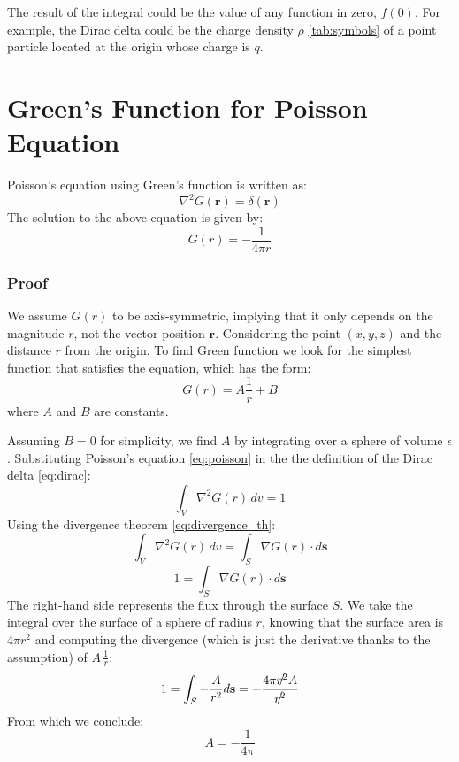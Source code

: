 The result of the integral could be the value of any function in zero, $f(0)$.
For example, the Dirac delta could be the charge density $\rho$ \ref{tab:symbols} 
of a point particle located at the origin whose charge is \(q\).

\section{Green's Function for Poisson Equation}
Poisson's equation using Green's function is written as:
\begin{equation}
\nabla^2 G(\mathbf{r}) = \delta(\mathbf{r})
\label{eq:poisson}
\end{equation}
The solution to the above equation is given by:
\[
G(r) =  - \frac{1}{4 \pi r}
\]
\subsubsection{Proof}
We assume \(G(r)\) to be axis-symmetric, implying that it only depends on the 
magnitude $r$, not the vector position $\mathbf{r}$.
Considering the point \((x,y,z)\) and the distance \(r\) from the origin.
To find Green function we look for the simplest function that satisfies the 
equation, which has the form:
\[
G(r) = A \frac{1}{r} + B
\]
where \(A\) and \(B\) are constants. 

Assuming \(B = 0\) for simplicity, we find \(A\) by integrating over a sphere of 
volume $\epsilon$.
Substituting Poisson's equation \ref{eq:poisson} in the the definition of the 
Dirac delta \ref{eq:dirac}:
\[
\int_V \nabla^2 G(r) \, dv = 1 
\]
Using the divergence theorem \ref{eq:divergence_th}:
\[
\int_V \nabla^2 G(r) \, dv = \int_S \nabla G(r) \cdot d\mathbf{s} 
\]
\[
1 = \int_S \nabla G(r) \cdot d\mathbf{s} 
\]
The right-hand side represents the flux through the surface \(S\). We take the 
integral over the surface of a sphere of radius \(r\), knowing that the surface 
area is \(4 \pi r^2\) and computing the divergence (which is just the derivative 
thanks to the assumption) of $A \, \frac{1}{r}$:
\[
1 = \int_S - \frac{A}{r^2} d\mathbf{s} = - \frac{4 \pi \slashed{r^2} 
A}{\slashed{r^2}}
\]
From which we conclude:
\[
A = - \frac{1}{4 \pi}
\]
